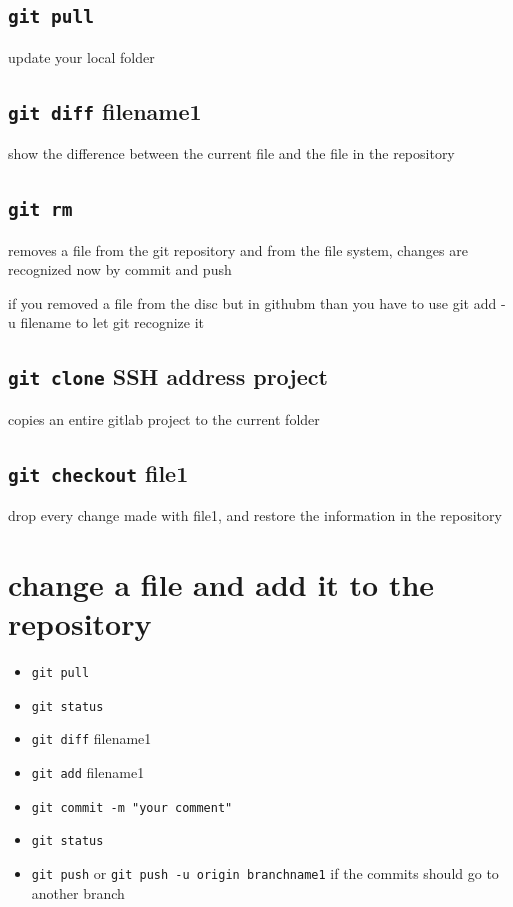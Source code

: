 \documentclass[ twoside,openright,titlepage,numbers=noenddot,headinclude,%
                footinclude=true, cleardoublepage=empty,abstractoff, %
                BCOR=5mm,paper=a4,fontsize=11pt,%
                ]{scrreprt}
\begin{document}
\subsection{\texttt{git pull}}
	update your local folder
\subsection{\texttt{git diff} filename1}
	show the difference between the current file and the file in the repository
\subsection{\texttt{git rm}}
	removes a file from the git repository and from the file system, changes are recognized now by commit and push	
	
	if you removed a file from the disc but in githubm than you have to use git add -u filename to let git recognize it
\subsection{\texttt{git clone} SSH address project}
		copies an entire gitlab project to the current folder
\subsection{\texttt{git checkout} file1 }
		drop every change made with file1, and restore the information in the repository 
\section{change a file and add it to the repository }
	\begin{itemize}
		\item \texttt{git pull}
		\item \texttt{git status}
		\item \texttt{git diff} filename1
		\item \texttt{git add} filename1
		\item \texttt{git commit -m "your comment"}
		\item \texttt{git status}
		\item \texttt{git push} or \texttt{git push -u origin branchname1} if the commits should go to another branch
	\end{itemize}
\end{document}
